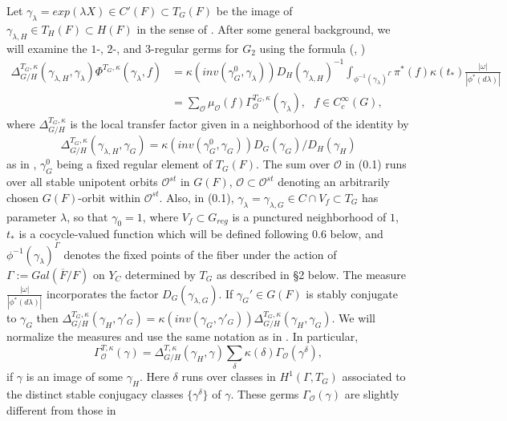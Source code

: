 \documentclass[12pt,letterpaper]{amsart}
\begin{document}
Let $\gamma_\lambda=exp(\lambda X)\in C'(F)\subset T_G(F)$ be the image of
$\gamma_{\lambda,H}\in T_H(F)\subset H(F)$ in the sense of \cite{LS90}.
After some general background, we will examine the $1$-, $2$-,
and $3$-regular germs for $G_2$ using the formula (\cite{Sh72}, \cite{LS90})
\[
\begin{split}
\Delta_{G/H}^{T_G,\kappa}(\gamma_{\lambda,H},\gamma_{\lambda})
\Phi^{T_G,\kappa}(\gamma_{\lambda},f)
&=\kappa(inv(\gamma^0_{G},\gamma_{\lambda}))
D_H(\gamma_{\lambda,H})^{-1}
\int_{\phi^{-1}(\gamma_{\lambda})^\Gamma}\pi^*(f)
\kappa(t_*)\frac{|\omega|}{|\phi^*(d\lambda)|}\\
&=\sum_{{\mathcal O}}\mu_{\mathcal O}(f)
\Gamma_{{\mathcal O}}^{T_G,\kappa}(\gamma_{\lambda}),
\ \ \ f\in C_c^\infty(G),
\end{split}
\tag{0.1}
\]
where $\Delta_{G/H}^{T_G,\kappa}$ is the local transfer factor given in a
neighborhood of the identity by
\[
\Delta_{G/H}^{T_G,\kappa}(\gamma_{\lambda,H},\gamma_G)
=\kappa(inv(\gamma^0_G,\gamma_G))D_G(\gamma_G)/D_H(\gamma_H)
\]
as in \cite{LS90}, $\gamma_G^0$ being a fixed regular element of $T_G(F)$.
The sum over ${\mathcal O}$ in (0.1) runs over all stable unipotent orbits
${\mathcal O}^{st}$ in $G(F)$, ${\mathcal O}\subset {\mathcal O}^{st}$
denoting an arbitrarily chosen $G(F)$-orbit within ${\mathcal O}^{st}$.
Also, in (0.1),
$\gamma_\lambda=\gamma_{\lambda,G}\in C\cap V_f\subset T_G$
has parameter $\lambda$,
so that $\gamma_0=1$, where $V_f\subset G_{reg}$
is a punctured neighborhood of $1$,
$t_*$ is a cocycle-valued function which will be defined following
0.6 below, and
$\phi^{-1}(\gamma_\lambda)^\Gamma$ denotes the fixed points of the fiber
under the action of $\Gamma:=Gal(\overline{F}/F)$ on $Y_C$ determined
by $T_G$ as described in \S 2 below.
The measure
$\frac{|\omega|}{|\phi^*(d\lambda)|}$ incorporates the factor
$D_G(\gamma_{\lambda,G})$.
If $\gamma_G'\in G(F)$ is stably conjugate to $\gamma_G$ then
$\Delta_{G/H}^{T_G,\kappa}(\gamma_H,\gamma'_G)
=\kappa(inv(\gamma_G,\gamma'_G))
\Delta_{G/H}^{T_G,\kappa}(\gamma_H,\gamma_G)$.
We will normalize
the measures and use the same notation as in \cite{LS89}. In particular,
\[
\Gamma_{{\mathcal O}}^{T,\kappa}(\gamma)=
\Delta_{G/H}^{T,\kappa}(\gamma_H,\gamma)\sum_\delta \kappa(\delta)
\Gamma_{\mathcal O}(\gamma^\delta),
\]
if $\gamma$ is an image of some $\gamma_H$. Here $\delta$ runs over
classes in $H^1(\Gamma,T_G)$ associated to the distinct stable
conjugacy classes $\{\gamma^\delta\}$ of $\gamma$. These germs
$\Gamma_{\mathcal O}(\gamma)$ are slightly different from those in \cite{Sh72}
\end{document}
